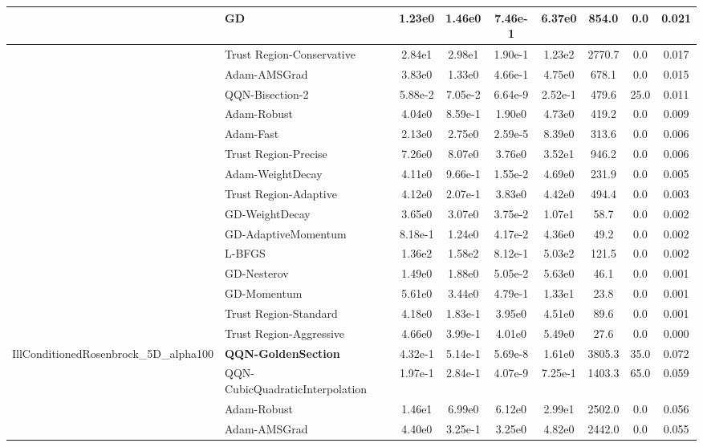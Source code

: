 \documentclass[10pt]{article}
\begin{document}
\begin{longtable}{|l|l|c|c|c|c|c|c|c|}
\hline
 & GD & 1.23e0 & 1.46e0 & 7.46e-1 & 6.37e0 & 854.0 & 0.0 & 0.021 \\
\hline
 & Trust Region-Conservative & 2.84e1 & 2.98e1 & 1.90e-1 & 1.23e2 & 2770.7 & 0.0 & 0.017 \\
\hline
 & Adam-AMSGrad & 3.83e0 & 1.33e0 & 4.66e-1 & 4.75e0 & 678.1 & 0.0 & 0.015 \\
\hline
 & QQN-Bisection-2 & 5.88e-2 & 7.05e-2 & 6.64e-9 & 2.52e-1 & 479.6 & 25.0 & 0.011 \\
\hline
 & Adam-Robust & 4.04e0 & 8.59e-1 & 1.90e0 & 4.73e0 & 419.2 & 0.0 & 0.009 \\
\hline
 & Adam-Fast & 2.13e0 & 2.75e0 & 2.59e-5 & 8.39e0 & 313.6 & 0.0 & 0.006 \\
\hline
 & Trust Region-Precise & 7.26e0 & 8.07e0 & 3.76e0 & 3.52e1 & 946.2 & 0.0 & 0.006 \\
\hline
 & Adam-WeightDecay & 4.11e0 & 9.66e-1 & 1.55e-2 & 4.69e0 & 231.9 & 0.0 & 0.005 \\
\hline
 & Trust Region-Adaptive & 4.12e0 & 2.07e-1 & 3.83e0 & 4.42e0 & 494.4 & 0.0 & 0.003 \\
\hline
 & GD-WeightDecay & 3.65e0 & 3.07e0 & 3.75e-2 & 1.07e1 & 58.7 & 0.0 & 0.002 \\
\hline
 & GD-AdaptiveMomentum & 8.18e-1 & 1.24e0 & 4.17e-2 & 4.36e0 & 49.2 & 0.0 & 0.002 \\
\hline
 & L-BFGS & 1.36e2 & 1.58e2 & 8.12e-1 & 5.03e2 & 121.5 & 0.0 & 0.002 \\
\hline
 & GD-Nesterov & 1.49e0 & 1.88e0 & 5.05e-2 & 5.63e0 & 46.1 & 0.0 & 0.001 \\
\hline
 & GD-Momentum & 5.61e0 & 3.44e0 & 4.79e-1 & 1.33e1 & 23.8 & 0.0 & 0.001 \\
\hline
 & Trust Region-Standard & 4.18e0 & 1.83e-1 & 3.95e0 & 4.51e0 & 89.6 & 0.0 & 0.001 \\
\hline
 & Trust Region-Aggressive & 4.66e0 & 3.99e-1 & 4.01e0 & 5.49e0 & 27.6 & 0.0 & 0.000 \\
IllConditionedRosenbrock\_5D\_alpha100 & \textbf{QQN-GoldenSection} & 4.32e-1 & 5.14e-1 & 5.69e-8 & 1.61e0 & 3805.3 & 35.0 & 0.072 \\
\hline
 & QQN-CubicQuadraticInterpolation & 1.97e-1 & 2.84e-1 & 4.07e-9 & 7.25e-1 & 1403.3 & 65.0 & 0.059 \\
\hline
 & Adam-Robust & 1.46e1 & 6.99e0 & 6.12e0 & 2.99e1 & 2502.0 & 0.0 & 0.056 \\
\hline
 & Adam-AMSGrad & 4.40e0 & 3.25e-1 & 3.25e0 & 4.82e0 & 2442.0 & 0.0 & 0.055 \\

\end{longtable}
\end{document}

